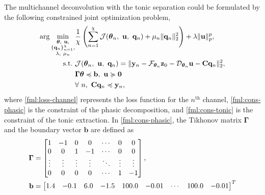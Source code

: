 \documentclass[]{article}
\begin{document}
The multichannel deconvolution with the tonic separation could be formulated by the following constrained joint optimization problem,
\begin{subequations} \label{fml:the:optimization}
  \renewcommand{\theequation}
  {\theparentequation-\arabic{equation}}
  \begin{align}
    \arg\min\limits_{\substack{\boldsymbol{\theta},~\mathbf{u}, \\ \{\mathbf{q}_n\}_{n=1}^{\chi}, \\ \lambda,~\mu_n}} & \frac{1}{\chi} \left( \sum_{n=1}^{\chi} \mathcal{J}(\boldsymbol{\theta}_n,~\mathbf{u},~\mathbf{q}_n) + \mu_n \lVert \mathbf{q}_n \rVert_2^2 \right) + \lambda \lVert \mathbf{u} \rVert^p_p, \\
    \mathrm{s.t.}~&\mathcal{J}(\boldsymbol{\theta}_n,~\mathbf{u},~\mathbf{q}_n) = \lVert \mathbf{y}_n - \mathcal{F}_{\boldsymbol{\theta}_n} \mathbf{z}_{0} - \mathcal{D}_{\boldsymbol{\theta}_n} \mathbf{u} - \mathbf{C} \mathbf{q}_n \rVert^2_2, \label{fml:loss-channel}\\
    & \boldsymbol{\Gamma} \boldsymbol{\theta} \preccurlyeq \mathbf{b},~ \mathbf{u} \succcurlyeq \mathbf{0} \label{fml:cons-phasic}\\
    & \forall~n,~\mathbf{C}\mathbf{q}_n \preccurlyeq \mathbf{y}_n, \label{fml:cons-tonic}
  \end{align}
\end{subequations}
where \eqref{fml:loss-channel} represents the loss function for the $n^{\mathrm{th}}$ channel, \eqref{fml:cons-phasic} is the constraint of the phasic decomposition, and \eqref{fml:cons-tonic} is the constraint of the tonic extraction. In \eqref{fml:cons-phasic}, the Tikhonov matrix $\boldsymbol{\Gamma}$ and the boundary vector $\mathbf{b}$ are defined as
\begin{subequations} \label{fml:the:constraint}
  \renewcommand{\theequation}
  {\theparentequation-\arabic{equation}}
  \begin{align}
    \boldsymbol{\Gamma} &= \begin{bmatrix}
      1 & -1 & 0 & 0 & \cdots & 0 & 0 \\
      0 & 0 & 1 & -1 & \cdots & 0 & 0 \\
      \vdots & \vdots & \vdots & \vdots & \ddots & \vdots & \vdots \\
      0 & 0 & 0 & 0 & \cdots & 1 & -1
    \end{bmatrix}, \\
    \mathbf{b} &= \begin{bmatrix}
      1.4 & -0.1 & 6.0 & -1.5 & 100.0 & -0.01 & \cdots & 100.0 & -0.01
    \end{bmatrix}^T
  \end{align}
\end{subequations}
\end{document}
